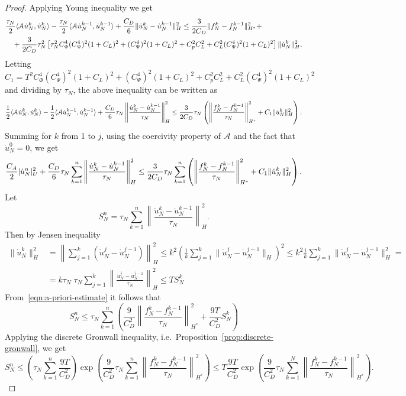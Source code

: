 \documentclass[a4paper,10pt,oneside]{amsbook}
\numberwithin{section}{chapter}
\numberwithin{equation}{chapter}
\theoremstyle{definition}
\DeclarePairedDelimiter{\norm}{\lVert}{\rVert}
\DeclarePairedDelimiter{\dual}{\langle}{\rangle}
\begin{document}
\begin{proof}
Applying Young inequality we get
\[
\begin{multlined}
\frac{\tau_N}{2}\dual{\mathcal{A}\dot u_N^k,\dot u_N^k}-\frac{\tau_N}{2}\dual{\mathcal{A}\dot u_N^{k-1},\dot u_N^{k-1}}+\frac{C_D}{6}\norm{\dot u_N^k-\dot u_N^{k-1}}_H^2\le\frac{3}{2C_D}\norm{f_N^k-f_N^{k-1}}_{H^*}^2+\\+
\frac{3}{2C_D}\tau_N^2\left[\tau_N^2C_\Phi^4(C_\Psi^4)^2(1+C_L)^2+(C_\Psi^4)^2(1+C_L)^2+C_p^2C_L^2+C_L^2(C_\Psi^4)^2(1+C_L)^2\right]\norm{\dot u_N^k}_H^2.
\end{multlined}
\]
Letting
\[
C_1=T^2C_\Phi^4(C_\Psi^4)^2(1+C_L)^2+(C_\Psi^4)^2(1+C_L)^2+C_p^2C_L^2+C_L^2(C_\Psi^4)^2(1+C_L)^2
\]
and dividing by $\tau_N$, the above inequality can be written as
\[
\frac{1}{2}\dual{\mathcal{A}\dot u_N^k,\dot u_N^k}-\frac{1}{2}\dual{\mathcal{A}\dot u_N^{k-1},\dot u_N^{k-1}}+\frac{C_D}{6}\tau_N\left\lVert\frac{\dot u_N^k-\dot u_N^{k-1}}{\tau_N}\right\rVert_H^2\le\frac{3}{2C_D}\tau_N\left(\left\lVert\frac{f_N^k-f_N^{k-1}}{\tau_N}\right\rVert_{H^*}^2+C_1\norm{\dot u_N^k}_H^2\right).
\]
Summing for $k$ from 1 to $j$, using the coercivity property of $\mathcal{A}$ and the fact that $\dot u_N^0=0$, we get
\begin{equation}
\label{eqn:a-priori-estimate}
\frac{C_A}{2}|\dot u_N^n|_U^2+\frac{C_D}{6}\tau_N\sum_{k=1}^n\left\lVert\frac{\dot u_N^k-\dot u_N^{k-1}}{\tau_N}\right\rVert_H^2\le\frac{3}{2C_D}\tau_N\sum_{k=1}^n\left(\left\lVert\frac{f_N^k-f_N^{k-1}}{\tau_N}\right\rVert_{H^*}^2+C_1\norm{\dot u_N^k}_H^2\right).
\end{equation}
Let
\[
S_N^n=\tau_N\sum_{k=1}^n\left\lVert\frac{\dot u_N^k-\dot u_N^{k-1}}{\tau_N}\right\rVert_H^2.
\]
Then by Jensen inequality
\[
\begin{split}
\|\dot{u}_N^k\|_H^2&=\left\|\sum_{j=1}^k(\dot{u}_N^j-\dot{u}_N^{j-1})\right\|_H^2\le k^2\left(\frac{1}{k}\sum_{j=1}^k\|\dot{u}_N^j-\dot{u}_N^{j-1}\|_H\right)^2\le k^2\frac{1}{k}\sum_{j=1}^k\|\dot{u}_N^j-\dot{u}_N^{j-1}\|_H^2=\\
&=k\tau_N\;\tau_N\sum_{j=1}^k\left\|\frac{\dot{u}_N^j-\dot{u}_N^{j-1}}{\tau_N}\right\|_H^2\le TS_N^k
\end{split}
\]
From~\eqref{eqn:a-priori-estimate} it follows that
\[
S_N^n\le\tau_N\sum_{k=1}^n\left(\frac{9}{C_D^2}\left\|\frac{f_N^k-f_N^{k-1}}{\tau_N}\right\|_{H^*}^2+\frac{9T}{C_D^2}S_N^k\right)
\]
Applying the discrete Gronwall inequality, i.e.\ Proposition~\ref{prop:discrete-gronwall}, we get
\[
S_N^n\le\left(\tau_N\sum_{k=1}^n\frac{9T}{C_D^2}\right)\exp\left(\frac{9}{C_D^2}\tau_N\sum_{k=1}^n\left\|\frac{f_N^k-f_N^{k-1}}{\tau_N}\right\|_{H^*}^2\right)\le T\frac{9T}{C_D^2}\exp\left(\frac{9}{C_D^2}\tau_N\sum_{k=1}^N\left\|\frac{f_N^k-f_N^{k-1}}{\tau_N}\right\|_{H^*}^2\right).
\]
\end{proof}
\end{document}

